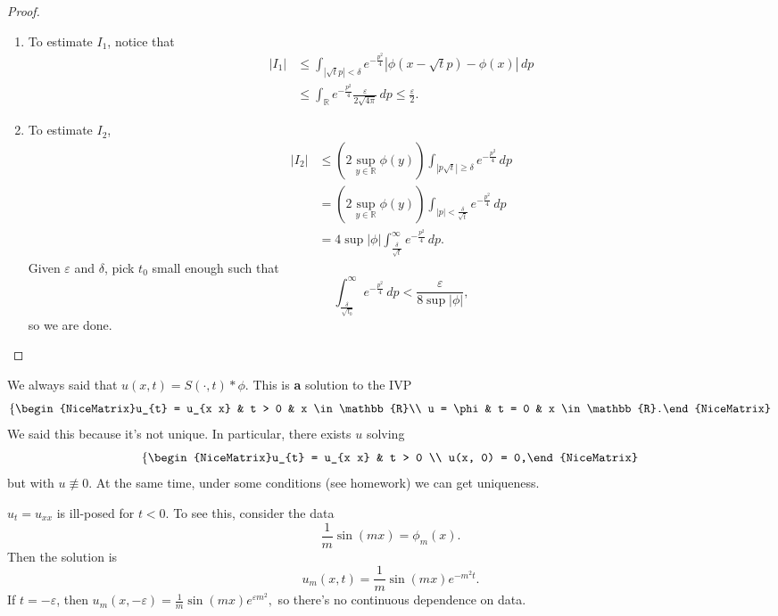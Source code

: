 \begin{proof}
\begin{enumerate}
\begin{enumerate}
					\item To estimate \( I_{1} \), notice that
						\begin{align*}
							|I_{1}| &\le \int_{|\sqrt{t} p| < \delta} e^{- \frac{p^{2}}{4}} | \phi(x - \sqrt{t}p) - \phi(x)| \, dp \\
							&\le \int_{\mathbb{R}} e^{- \frac{p^{2}}{4}} \frac{\varepsilon}{2 \sqrt{4 \pi}} \, dp \le \frac{\varepsilon}{2}.
						\end{align*}
					\item To estimate \( I_{2} \),
						\begin{align*}
							|I_{2}| &\le \left( 2 \sup_{y \in \mathbb{R}} \phi(y) \right) \int_{|p \sqrt{t}| \ge \delta} e^{- \frac{p^{2}}{4}} \, dp \\
											&=\left( 2 \sup_{y \in \mathbb{R}} \phi(y) \right) \int_{|p| < \frac{\delta}{\sqrt{t}}} e^{- \frac{p^{2}}{4}}\, dp  \\
											&= 4 \sup | \phi| \int_{\frac{\delta}{\sqrt{t}}}^{\infty} e^{- \frac{p^{2}}{4}}\, dp. 
						\end{align*}
						Given \( \varepsilon \) and \( \delta \), pick \( t_{0} \) small enough such that
						\[ \int_{\frac{\delta}{\sqrt{t_{0}}}}^{\infty} e^{- \frac{p^{2}}{4}}\, dp < \frac{\varepsilon}{8 \sup | \phi|}, \]
						so we are done.
				\end{enumerate}
	\end{enumerate}
\end{proof}

\begin{remark}
	We always said that \( u(x, t) = S(\cdot, t) * \phi \). This is \textbf{a} solution to the IVP
	\[ \left\{\begin{NiceMatrix}u_{t} = u_{x x} & t > 0 & x \in \mathbb{R}\\ u = \phi & t = 0 & x \in \mathbb{R}.\end{NiceMatrix}\right.  \]
	We said this because it's not unique. In particular, there exists \( u \) solving
	\[ \left\{\begin{NiceMatrix}u_{t} = u_{x x} & t > 0 \\ u(x, 0) = 0,\end{NiceMatrix}\right.  \]
	but with \( u \not \equiv 0 \). At the same time, under some conditions (see homework) we can get uniqueness.
\end{remark}

\begin{remark}
	\( u_{t} = u_{x x} \) is ill-posed for \( t < 0 \). To see this, consider the data
	\[ \frac{1}{m} \sin(m x) = \phi_{m}(x). \]
	Then the solution is
	\[ u_{m}(x, t) = \frac{1}{m} \sin(mx) e^{- m^{2} t}. \]
	If \( t = - \varepsilon \), then \( u_{m}(x, - \varepsilon) = \frac{1}{m}\sin(mx) e^{\varepsilon m^{2}}, \)
	so there's no continuous dependence on data.
\end{remark}

